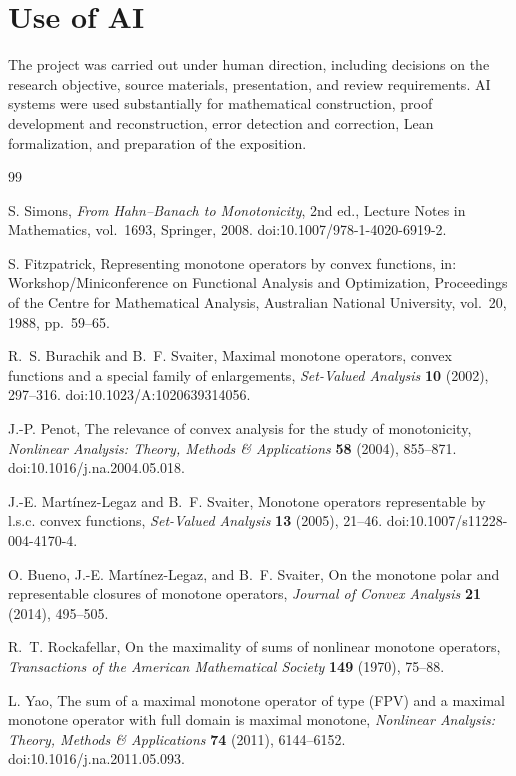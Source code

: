\documentclass[11pt]{article}
\begin{document}
\ifdefined\expandedversion

\fi
\fi

\section*{Use of AI}
The project was carried out under human direction, including decisions on
the research objective, source materials, presentation, and review requirements.
AI systems were used substantially for mathematical construction, proof
development and reconstruction, error detection and correction, Lean
formalization, and preparation of the exposition.

\begin{thebibliography}{99}
\raggedright
{}
S. Simons,
\emph{From Hahn--Banach to Monotonicity}, 2nd ed.,
Lecture Notes in Mathematics, vol.~1693, Springer, 2008.
doi:10.1007/978-1-4020-6919-2.

S. Fitzpatrick,
Representing monotone operators by convex functions,
in: Workshop/Miniconference on Functional Analysis and Optimization,
Proceedings of the Centre for Mathematical Analysis, Australian National
University, vol.~20, 1988, pp.~59--65.

R.~S. Burachik and B.~F. Svaiter,
Maximal monotone operators, convex functions and a special family of enlargements,
\emph{Set-Valued Analysis} \textbf{10} (2002), 297--316.
doi:10.1023/A:1020639314056.

J.-P. Penot,
The relevance of convex analysis for the study of monotonicity,
\emph{Nonlinear Analysis: Theory, Methods \& Applications}
\textbf{58} (2004), 855--871.
doi:10.1016/j.na.2004.05.018.

J.-E. Mart\'{i}nez-Legaz and B.~F. Svaiter,
Monotone operators representable by l.s.c. convex functions,
\emph{Set-Valued Analysis} \textbf{13} (2005), 21--46.
doi:10.1007/s11228-004-4170-4.

O. Bueno, J.-E. Mart\'{i}nez-Legaz, and B.~F. Svaiter,
On the monotone polar and representable closures of monotone operators,
\emph{Journal of Convex Analysis} \textbf{21} (2014), 495--505.

R.~T. Rockafellar,
On the maximality of sums of nonlinear monotone operators,
\emph{Transactions of the American Mathematical Society}
\textbf{149} (1970), 75--88.

L. Yao,
The sum of a maximal monotone operator of type (FPV) and a maximal
monotone operator with full domain is maximal monotone,
\emph{Nonlinear Analysis: Theory, Methods \& Applications}
\textbf{74} (2011), 6144--6152.
doi:10.1016/j.na.2011.05.093.


\end{thebibliography}
\end{document}

